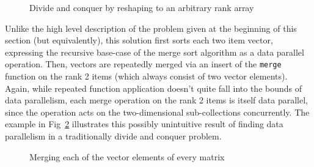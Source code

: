 
\begin{figure}[pht]
\begin{quote}
\begin{singlespacing}
\begin{small}
\end{small}
\end{singlespacing}
\end{quote}
\caption{Divide and conquer by reshaping to an arbitrary rank array}
\label{fig::divide}
\end{figure}

Unlike the high level description of the problem given at the beginning of this section (but equivalently), 
this solution first sorts each two item vector, 
expressing the recursive base-case of the merge sort algorithm as a data parallel operation.
Then, vectors are repeatedly merged via an insert of the \texttt{merge} function on the rank 2 items 
(which always consist of two vector elements).
Again, while repeated function application doesn't quite fall into the bounds of data parallelism, 
each merge operation on the rank 2 items is itself data parallel, 
since the operation acts on the two-dimensional sub-collections concurrently. 
The example in Fig~\ref{fig::conquer} illustrates this possibly unintuitive result of finding data parallelism 
in a traditionally divide and conquer problem.

\begin{figure}[hp]
\begin{quote}
\begin{singlespacing}
\begin{small}
\end{small}
\end{singlespacing}
\caption{Merging each of the vector elements of every matrix}
\label{fig::conquer}
\end{quote}

\end{figure}

